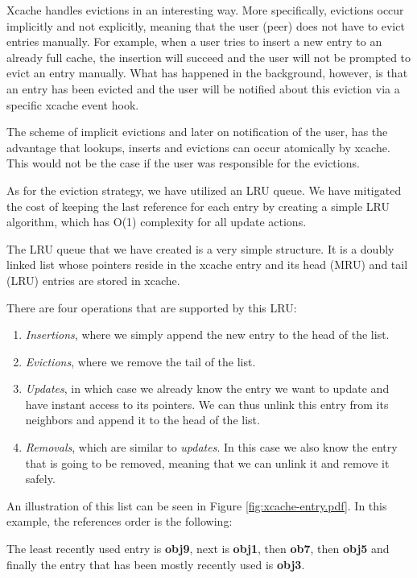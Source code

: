 Xcache handles evictions in an interesting way. More specifically, evictions 
occur implicitly and not explicitly, meaning that the user (peer) does not have 
to evict entries manually. For example, when a user tries to insert a new entry 
to an already full cache, the insertion will succeed and the user will not be 
prompted to evict an entry manually. What has happened in the background, 
however, is that an entry has been evicted and the user will be notified about 
this eviction via a specific xcache event hook.

The scheme of implicit evictions and later on notification of the user, has the 
advantage that lookups, inserts and evictions can occur atomically by xcache.  
This would not be the case if the user was responsible for the evictions.

As for the eviction strategy, we have utilized an LRU queue. We have mitigated 
the cost of keeping the last reference for each entry by creating a simple LRU 
algorithm, which has O(1) complexity for all update actions.

The LRU queue that we have created is a very simple structure. It is a doubly 
linked list whose pointers reside in the xcache entry and its head (MRU) and 
tail (LRU) entries are stored in xcache.

There are four operations that are supported by this LRU:

\begin{enumerate}
	\item \textit{Insertions}, where we simply append the new entry to the
		head of the list.
	\item \textit{Evictions}, where we remove the tail of the list.
	\item \textit{Updates}, in which case we already know the entry we want 
		to update and have instant access to its pointers.  We can thus 
		unlink this entry from its neighbors and append it to the head 
		of the list.
	\item \textit{Removals}, which are similar to \textit{updates}. In this 
		case we also know the entry that is going to be removed, 
		meaning that we can unlink it and remove it safely.
\end{enumerate}

An illustration of this list can be seen in Figure \ref{fig:xcache-entry.pdf}.  
In this example, the references order is the following:

The least recently used entry is \textbf{obj9}, next is \textbf{obj1}, then 
\textbf{ob7}, then \textbf{obj5} and finally the entry that has been mostly 
recently used is \textbf{obj3}.

